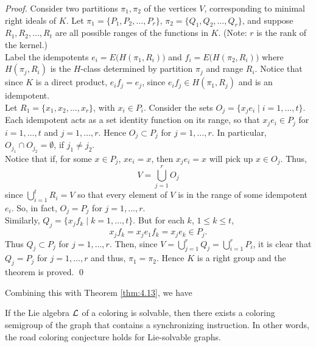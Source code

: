 \begin{proof}
Consider two partitions $\pi_1,\pi_2$ of the vertices $V$, corresponding to minimal right ideals of $K$.
Let $\pi_1 = \{P_1,P_2,\ldots,P_r\}$, $\pi_2 = \{Q_1,Q_2,\ldots,Q_r\}$, and suppose $R_1,R_2,\ldots,R_t$ are all possible ranges of the functions in $K$. (Note: $r$ is the rank of the kernel.)\\

Label the idempotents $e_i = E\big(H(\pi_1,R_i)\big)$ and $f_i = E\big(H(\pi_2,R_i)\big)$ where $H(\pi_j,R_i)$ is the $H$-class determined by partition $\pi_j$ and range $R_i$.
Notice that since $K$ is a direct product, $e_if_j = e_j$, since $e_if_j \in H(\pi_1,R_j)$ and is an idempotent.\\

Let $R_1 = \{x_1,x_2,\ldots,x_r\}$, with $x_i \in P_i$.
Consider the sets  $O_j = \{x_je_i \mid i=1,\ldots,t\}$.
Each idempotent acts as a set identity function on its range, so that 
$x_je_i \in P_j$ for $i = 1,\ldots,t$ and $j=1,\ldots,r$.
Hence $O_j \subset P_j$ for $j = 1,\ldots,r$.
In particular, $O_{j_1} \cap O_{j_2} = \emptyset$, if $j_1 \not= j_2$.\\

Notice that if, for some $x\in P_j$, $xe_i=x$, then $x_je_i=x$ will pick up $x\in O_j$.
Thus,
$$
  V = \bigcup^r_{j=1} O_j
$$
since $\bigcup\limits^t_{i=1} R_i = V$ so that
every element of $V$ is in the range of some idempotent $e_i$.
So, in fact, $O_j = P_j$ for $j = 1,\ldots,r$.\\

Similarly, $Q_j = \{ x_jf_k \mid k = 1,\ldots,t\}$.
But for each $k$, $1\le k\le t$,
$$
  x_jf_k = x_je_1f_k = x_je_k \in P_j.
$$
Thus $Q_j \subset P_j$ for $j = 1,\ldots,r$.
Then, since $V=\bigcup\limits^r_{j=1} Q_j = \bigcup\limits^r_{i=1} P_i $, it is clear that 
 $Q_j = P_j$ for $j = 1,\ldots,r$ and thus, $\pi_1 = \pi_2$.
Hence $K$ is a right group and the theorem is proved.
\qed
\end{proof}

Combining this with Theorem \ref{thm:4.13}, we have 

\begin{corollary}\label{cor:sync}
If the Lie algebra ${\mathcal L}$ of a coloring is solvable, then there exists a coloring semigroup
of the graph that contains a synchronizing instruction. In other words, 
the road coloring conjecture holds for Lie-solvable graphs.

\end{corollary}

